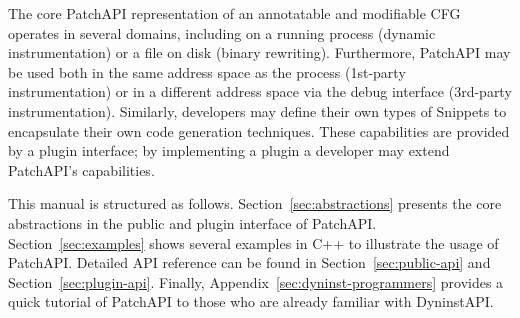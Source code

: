 The core PatchAPI representation of an annotatable and modifiable CFG
operates in several domains, including on a running process (dynamic
instrumentation) or a file on disk (binary rewriting). Furthermore,
PatchAPI may be used both in the same address space as the process
(1st-party instrumentation) or in a different address space via the
debug interface (3rd-party instrumentation). Similarly, developers may
define their own types of Snippets to encapsulate their own code
generation techniques. These capabilities are provided by a plugin
interface; by implementing a plugin a developer may extend PatchAPI's
capabilities.

This manual is structured as follows. Section~\ref{sec:abstractions} presents the core
abstractions in the public and plugin interface of
PatchAPI. Section~\ref{sec:examples} shows several examples in C++ to illustrate
the usage of PatchAPI. Detailed API reference can be found in
Section~\ref{sec:public-api} and Section~\ref{sec:plugin-api}. Finally,
Appendix~\ref{sec:dyninst-programmers} provides a quick tutorial of PatchAPI to those who are
already familiar with DyninstAPI.
